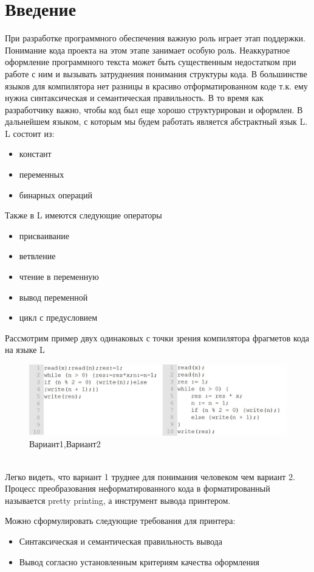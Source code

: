 \documentclass{matmex-diploma}
\begin{document}
\section*{Введение}
При разработке программного обеспечения важную роль играет этап поддержки. Понимание кода проекта на этом этапе занимает особую роль. Неаккуратное оформление программного текста может быть существенным недостатком при работе с ним и вызывать затруднения понимания структуры кода. В большинстве языков для компилятора нет разницы в красиво отформатированном коде т.к. ему нужна синтаксическая и семантическая правильность. В то время как разработчику важно, чтобы код был еще хорошо структурирован и оформлен.
    В дальнейшем языком, с которым мы будем работать является абстрактный язык L.
L состоит из:
\begin{itemize}
    \item констант
    \item переменных
    \item бинарных операций
\end{itemize}
Также в L имеются следующие операторы
\begin{itemize}
    \item присваивание
    \item ветвление
    \item чтение в переменную
    \item вывод переменной
    \item цикл с предусловием
\end{itemize}
Рассмотрим пример двух одинаковых с точки зрения компилятора фрагметов кода на языке L
\begin{figure}[h]
    \centering
    \includegraphics[scale=0.5]{Images/image01.png}
    \caption{Вариант1,Вариант2}
\end{figure}
\\Легко видеть, что вариант 1 труднее для понимания человеком чем вариант 2. Процесс преобразования неформатированного кода в форматированный называется  pretty printing, а инструмент вывода принтером.

Можно сформулировать следующие требования для принтера:
\begin{itemize}
    \item Синтаксическая и семантическая правильность вывода 
    \item Вывод согласно установленным критериям качества оформления
\end{itemize}
\end{document}
